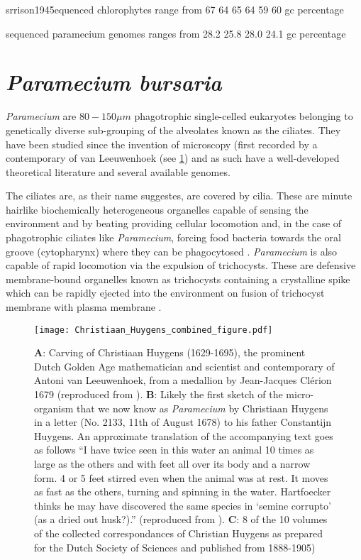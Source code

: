 srrison1945equenced chlorophytes range from  67 64 65 64 59 60 gc percentage \citep{Blanc2010a}

sequenced paramecium genomes ranges from 28.2 25.8 28.0 24.1 gc percentage \citep{McGrath2014}







\section{\textit{Paramecium bursaria}}

\textit{Paramecium} are \(80-150\mu m\) phagotrophic single-celled eukaryotes belonging 
to genetically diverse \citep{Prescott1994} sub-grouping of the alveolates known as the ciliates.
They have been studied since the invention of microscopy (first recorded by a contemporary of van Leeuwenhoek 
(see \ref{fig:huygens}) and as such have a well-developed theoretical literature and several available genomes.  

The ciliates are, as their name suggestes, are covered by cilia. 
These are minute hairlike biochemically heterogeneous organelles capable of sensing the environment and by
beating providing cellular locomotion and, in the case of phagotrophic ciliates like \textit{Paramecium}, forcing food bacteria towards
the oral groove (cytopharynx) where they can be phagocytosed \citep{Hamel2011,AubussonFleury2015}. %
\textit{Paramecium} is also capable of rapid locomotion via the expulsion of trichocysts.
These are defensive membrane-bound organelles known as trichocysts containing a crystalline spike which can be 
rapidly ejected into the environment on fusion of trichocyst membrane with plasma membrane \citep{Hamel2011}.

\begin{figure}[h!]
    \caption{\textbf{A}: Carving of Christiaan Huygens (1629-1695), the prominent Dutch Golden Age mathematician and scientist and contemporary of Antoni van Leeuwenhoek, from a medallion by Jean-Jacques Cl\'erion 1679 (reproduced from \citep{Huygens}). \textbf{B}: Likely the first sketch of the micro-organism that we now know as \textit{Paramecium} by Christiaan Huygens in a letter (No. 2133, 11th of August 1678) to his father Constantijn Huygens. An approximate translation of the accompanying text goes as follows ``I have twice seen in this water an animal 10 times as large as the others and with feet all over its body and a narrow form. 4 or 5 feet stirred even when the animal was at rest. It moves as fast as the others, turning and spinning in the water. Hartfoecker thinks he may have discovered the same species in `semine corrupto' (as a dried out husk?).'' (reproduced from \citep{Huygens}). \textbf{C}: 8 of the 10 volumes of the collected correspondances of Christian Huygens as prepared for the Dutch Society of Sciences and published from 1888-1905)}
    \label{fig:huygens}
\texttt{[image: Christiaan\_Huygens\_combined\_figure.pdf]}
\end{figure}


